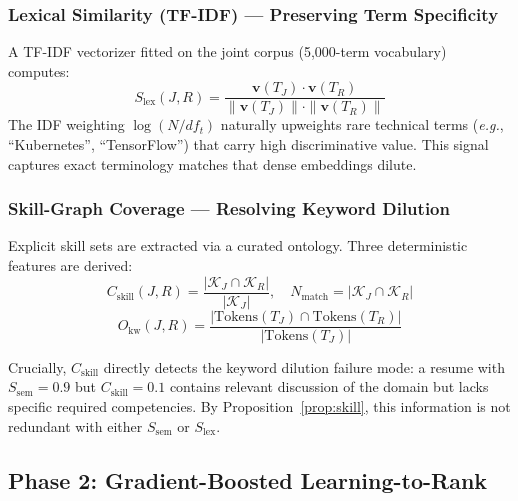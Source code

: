 \documentclass{llncs}
\begin{document}
\subsubsection{Lexical Similarity (TF-IDF) --- Preserving Term Specificity}
A TF-IDF vectorizer fitted on the joint corpus (5,000-term vocabulary) computes:
\begin{equation}
    S_{\mathrm{lex}}(J, R) = \frac{\mathbf{v}(T_J) \cdot \mathbf{v}(T_R)}{\|\mathbf{v}(T_J)\| \cdot \|\mathbf{v}(T_R)\|}
\end{equation}
The IDF weighting $\log(N/df_t)$ naturally upweights rare technical terms (\textit{e.g.}, ``Kubernetes'', ``TensorFlow'') that carry high discriminative value. This signal captures exact terminology matches that dense embeddings dilute.

\subsubsection{Skill-Graph Coverage --- Resolving Keyword Dilution}
Explicit skill sets are extracted via a curated ontology. Three deterministic features are derived:
\begin{equation}
    C_{\mathrm{skill}}(J, R) = \frac{|\mathcal{K}_J \cap \mathcal{K}_R|}{|\mathcal{K}_J|}, \quad
    N_{\mathrm{match}} = |\mathcal{K}_J \cap \mathcal{K}_R|
\end{equation}
\begin{equation}
    O_{\mathrm{kw}}(J, R) = \frac{|\mathrm{Tokens}(T_J) \cap \mathrm{Tokens}(T_R)|}{|\mathrm{Tokens}(T_J)|}
\end{equation}

Crucially, $C_\text{skill}$ directly detects the keyword dilution failure mode: a resume with $S_\text{sem} = 0.9$ but $C_\text{skill} = 0.1$ contains relevant discussion of the domain but lacks specific required competencies. By Proposition~\ref{prop:skill}, this information is not redundant with either $S_\text{sem}$ or $S_\text{lex}$.

\subsection{Phase 2: Gradient-Boosted Learning-to-Rank}
\end{document}
